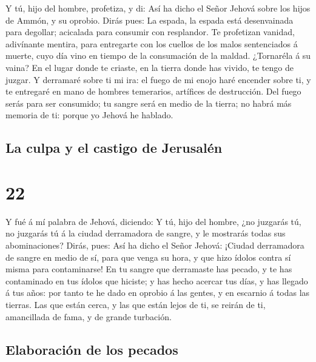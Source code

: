 Y tú, hijo del hombre, profetiza, y di: Así ha dicho el
Señor Jehová sobre los hijos de Ammón, y su oprobio. Dirás pues: La
espada, la espada está desenvainada para degollar; acicalada para
consumir con resplandor.  Te profetizan vanidad,
adivínante mentira, para entregarte con los cuellos de los malos
sentenciados á muerte, cuyo día vino en tiempo de la consumación de la
maldad.  ¿Tornaréla á su vaina? En el lugar donde te
criaste, en la tierra donde has vivido, te tengo de juzgar.
 Y derramaré sobre ti mi ira: el fuego de mi enojo haré
encender sobre ti, y te entregaré en mano de hombres temerarios,
artífices de destrucción.  Del fuego serás para ser
consumido; tu sangre será en medio de la tierra; no habrá más memoria de
ti: porque yo Jehová he hablado.

\hypertarget{la-culpa-y-el-castigo-de-jerusaluxe9n}{%
\subsection{La culpa y el castigo de
Jerusalén}\label{la-culpa-y-el-castigo-de-jerusaluxe9n}}

\hypertarget{section-26-22}{%
\section{22}\label{section-26-22}}

 Y fué á mí palabra de Jehová, diciendo:  Y
tú, hijo del hombre, ¿no juzgarás tú, no juzgarás tú á la ciudad
derramadora de sangre, y le mostrarás todas sus abominaciones?
 Dirás, pues: Así ha dicho el Señor Jehová: ¡Ciudad
derramadora de sangre en medio de sí, para que venga su hora, y que hizo
ídolos contra sí misma para contaminarse!  En tu sangre
que derramaste has pecado, y te has contaminado en tus ídolos que
hiciste; y has hecho acercar tus días, y has llegado á tus años: por
tanto te he dado en oprobio á las gentes, y en escarnio á todas las
tierras.  Las que están cerca, y las que están lejos de
ti, se reirán de ti, amancillada de fama, y de grande turbación.

\hypertarget{elaboraciuxf3n-de-los-pecados}{%
\subsection{Elaboración de los
pecados}\label{elaboraciuxf3n-de-los-pecados}}

